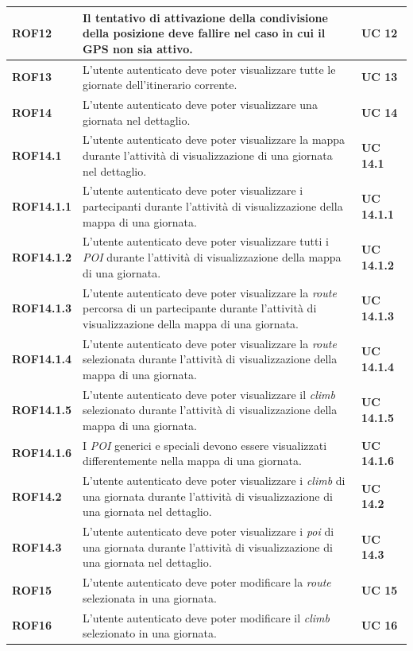 \begin{longtable}{ |p{2cm}|p{8cm}|p{2cm}|  }
    \textbf{ROF12} & Il tentativo di attivazione della condivisione della posizione deve fallire nel caso in cui il GPS non sia attivo. & \textbf{UC 12} \\ \hline
    \textbf{ROF13} & L'utente autenticato deve poter visualizzare tutte le giornate dell'itinerario corrente. & \textbf{UC 13} \\ \hline
    \textbf{ROF14} & L'utente autenticato deve poter visualizzare una giornata nel dettaglio. & \textbf{UC 14} \\ \hline
    \textbf{ROF14.1} & L'utente autenticato deve poter visualizzare la mappa durante l'attività di visualizzazione di una giornata nel dettaglio. & \textbf{UC 14.1} \\ \hline
    \textbf{ROF14.1.1} & L'utente autenticato deve poter visualizzare i partecipanti durante l'attività di visualizzazione della mappa di una giornata. & \textbf{UC 14.1.1}\\ \hline
    \textbf{ROF14.1.2} & L'utente autenticato deve poter visualizzare tutti i \textit{POI} durante l'attività di visualizzazione della mappa di una giornata. & \textbf{UC 14.1.2}\\ \hline
    \textbf{ROF14.1.3} & L'utente autenticato deve poter visualizzare la \textit{route} percorsa di un partecipante durante l'attività di visualizzazione della mappa di una giornata. & \textbf{UC 14.1.3}\\ \hline
    \textbf{ROF14.1.4} & L'utente autenticato deve poter visualizzare la \textit{route} selezionata durante l'attività di visualizzazione della mappa di una giornata. & \textbf{UC 14.1.4} \\ \hline
    \textbf{ROF14.1.5} & L'utente autenticato deve poter visualizzare il \textit{climb} selezionato durante l'attività di visualizzazione della mappa di una giornata. & \textbf{UC 14.1.5} \\ \hline
    \textbf{ROF14.1.6} & I \textit{POI} generici e speciali devono essere visualizzati differentemente nella mappa di una giornata. & \textbf{UC 14.1.6} \\ \hline
    \textbf{ROF14.2} & L'utente autenticato deve poter visualizzare i \textit{climb} di una giornata durante l'attività di visualizzazione di una giornata nel dettaglio. & \textbf{UC 14.2} \\ \hline
    \textbf{ROF14.3} & L'utente autenticato deve poter visualizzare i \textit{poi} di una giornata durante l'attività di visualizzazione di una giornata nel dettaglio. & \textbf{UC 14.3} \\ \hline
    \textbf{ROF15} & L'utente autenticato deve poter modificare la \textit{route} selezionata in una giornata. & \textbf{UC 15} \\ \hline
    \textbf{ROF16} & L'utente autenticato deve poter modificare il \textit{climb} selezionato in una giornata. & \textbf{UC 16} \\ \hline
\end{longtable}

